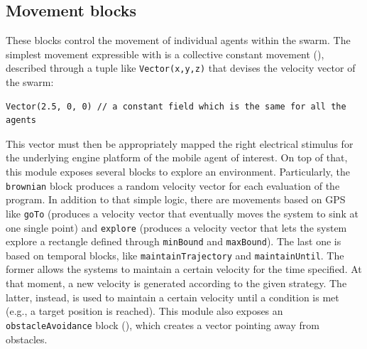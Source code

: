 \subsection{Movement blocks}\label{coordination2023-macro:subsec:base}
%
These blocks control the movement of individual agents within the swarm. 
The simplest movement expressible 
 with \MacroSwarm{} is a collective constant movement (), 
 described through a tuple 
 like \lstinline|Vector(x,y,z)|
 that devises the velocity vector of the swarm:
\begin{lstlisting}
Vector(2.5, 0, 0) // a constant field which is the same for all the agents
\end{lstlisting}
This vector must then be appropriately mapped 
 the right electrical stimulus for the underlying engine platform
 of the mobile agent of interest.
On top of that, 
 this module exposes several blocks to explore an environment. 
%
Particularly, the \lstinline|brownian| block produces a random velocity vector 
 for each evaluation of the program. 
%
In addition to that simple logic, 
 there are movements based on GPS like \lstinline|goTo| 
 (produces a velocity vector that eventually moves the system to sink at one single point)
 and \lstinline|explore| 
 (produces a velocity vector that lets the system explore a rectangle defined through \lstinline|minBound| and \lstinline|maxBound|).
%
The last one is based on temporal blocks, 
  like \lstinline|maintainTrajectory| and \lstinline|maintainUntil|.
%
The former allows the systems to maintain a certain velocity for the time specified. 
 At that moment, a new velocity is generated according to the given strategy. 
% 
The latter, instead, is used to maintain a certain velocity until a condition is met 
 (e.g., a target position is reached).
%
This module also exposes an \lstinline|obstacleAvoidance| block (), which creates a vector pointing away from obstacles.

